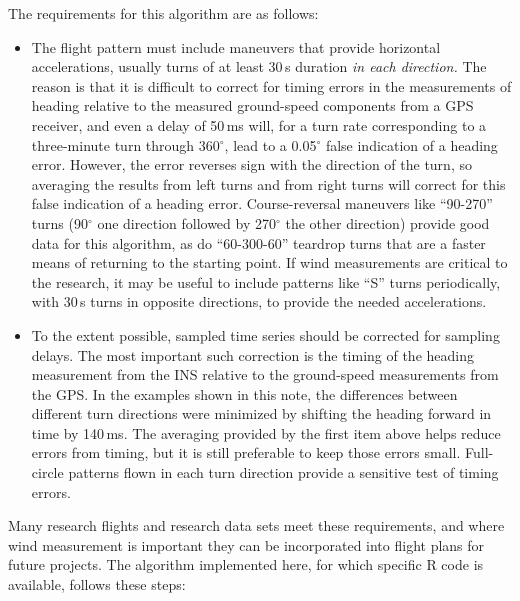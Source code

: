 \documentclass[english,british,amtd,bookmarks=false,unicode=true]{copernicus}\usepackage[]{graphicx}\usepackage[]{color}
\begin{document}
The requirements for this algorithm are as follows:
\begin{itemize}
\item The flight pattern must include maneuvers that provide horizontal
accelerations, usually turns of at least 30\,s duration \emph{in
each direction.} The reason is that it is difficult to correct for
timing errors in the measurements of heading relative to the measured
ground-speed components from a GPS receiver, and even a delay of 50\,ms
will, for a turn rate corresponding to a three-minute turn through
360$^{\circ}$, lead to a 0.05$^{\circ}$ false indication of a heading
error. However, the error reverses sign with the direction of the
turn, so averaging the results from left turns and from right turns
will correct for this false indication of a heading error. Course-reversal
maneuvers like ``90-270'' turns (90$^{\circ}$ one direction followed
by 270$^{\circ}$ the other direction) provide good data for this
algorithm, as do ``60-300-60'' teardrop turns that are a faster
means of returning to the starting point. If wind measurements are
critical to the research, it may be useful to include patterns like
``S'' turns periodically, with 30\,s turns in opposite directions,
to provide the needed accelerations.
\item To the extent possible, sampled time series should be corrected for
sampling delays. The most important such correction is the timing
of the heading measurement from the INS relative to the ground-speed
measurements from the GPS. In the examples shown in this note, the
differences between different turn directions were minimized by shifting
the heading forward in time by 140\,ms. The averaging provided by
the first item above helps reduce errors from timing, but it is still
preferable to keep those errors small. Full-circle patterns flown
in each turn direction provide a sensitive test of timing errors.
\end{itemize}
Many research flights and research data sets meet these requirements,
and where wind measurement is important they can be incorporated into
flight plans for future projects. The algorithm implemented here,
for which specific R code is available, follows these steps:
\end{document}
